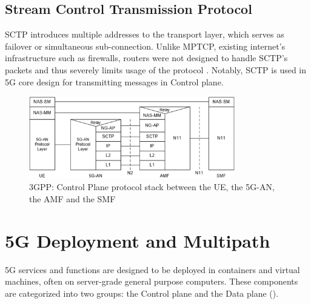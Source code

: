 \subsection{Stream Control Transmission Protocol}\label{sec:related_work:mp_connection:SCTP}
\ac{SCTP} introduces multiple addresses to the transport layer, which serves as failover or simultaneous sub-connection.
Unlike \ac{MPTCP}, existing internet's infrastructure such as firewalls, routers were not designed to handle \ac{SCTP}'s packets and thus severely limits usage of the protocol \cite{paasch_multipath_2014}. 
Notably, \ac{SCTP} is used in 5G core design for transmitting messages in Control plane.

\begin{figure}[H]
	\centering
	\includegraphics[width=0.8\textwidth]{resources/images/3gpp_5g_part_of_control_plane_protocol.png}
	\caption{3GPP: Control Plane protocol stack between the UE, the 5G-AN, the AMF and the SMF \cite{3gpp_5g_system_overview}}
    \label{fig:related_work:3gpp_5g_part_of_control_plane_protocol}
\end{figure}


\section{5G Deployment and Multipath}
5G services and functions are designed to be deployed in containers and virtual machines, often on server-grade general purpose computers.
These components are categorized into two groups: the Control plane and the Data plane ().

